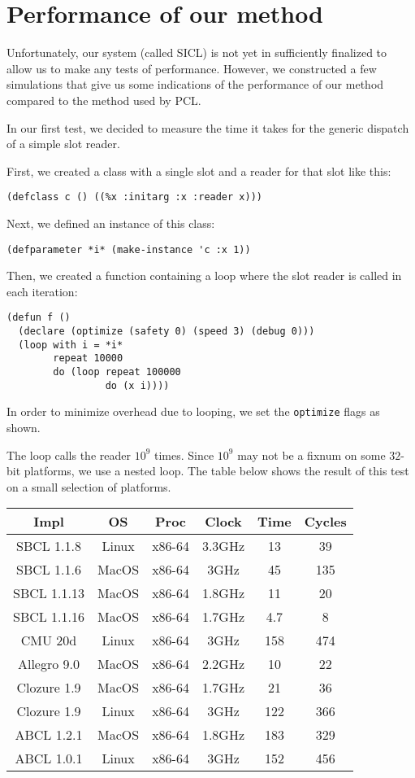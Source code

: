 \section{Performance of our method}

Unfortunately, our system (called SICL) is not yet in sufficiently
finalized to allow us to make any tests of performance.  However, we
constructed a few simulations that give us some indications of the
performance of our method compared to the method used by PCL.

In our first test, we decided to measure the time it takes for the
generic dispatch of a simple slot reader. 

First, we created a class with a single slot and a reader for that
slot like this:

\begin{verbatim}
(defclass c () ((%x :initarg :x :reader x)))  
\end{verbatim}

Next, we defined an instance of this class:

\begin{verbatim}
(defparameter *i* (make-instance 'c :x 1))
\end{verbatim}

Then, we created a function containing a loop where the slot reader is
called in each iteration: 

\begin{verbatim}
(defun f ()
  (declare (optimize (safety 0) (speed 3) (debug 0)))
  (loop with i = *i*
        repeat 10000
        do (loop repeat 100000
                 do (x i))))
\end{verbatim}

In order to minimize overhead due to looping, we set the
\texttt{optimize} flags as shown.

The loop calls the reader $10^9$ times.  Since $10^9$ may not be a
fixnum on some $32$-bit platforms, we use a nested loop.  The table
below shows the result of this test on a small selection of platforms.

{\small\begin{tabular}{|c|c|c|c|c|c|}
\hline
Impl & OS & Proc & Clock & Time & Cycles\\
\hline\hline
SBCL 1.1.8 & Linux & x86-64  & 3.3GHz & 13 & 39\\
SBCL 1.1.6 & MacOS & x86-64 & 3GHz & 45 & 135\\
SBCL 1.1.13 & MacOS & x86-64 & 1.8GHz & 11 & 20 \\
SBCL 1.1.16 & MacOS & x86-64 & 1.7GHz & 4.7 & 8 \\
CMU 20d & Linux & x86-64 & 3GHz & 158 & 474\\
Allegro 9.0 & MacOS & x86-64 & 2.2GHz & 10 & 22\\
Clozure 1.9 & MacOS & x86-64 & 1.7GHz & 21 & 36\\
Clozure 1.9 & Linux & x86-64 & 3GHz & 122 & 366\\
ABCL 1.2.1 & MacOS & x86-64 & 1.8GHz & 183 & 329\\
ABCL 1.0.1 & Linux & x86-64 & 3GHz & 152 & 456\\
\hline
\end{tabular}}

